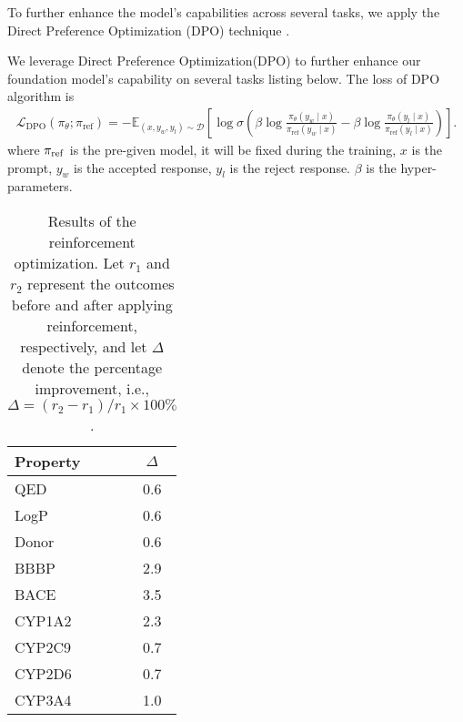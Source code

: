 To further enhance the model's capabilities across several tasks, we apply the Direct Preference Optimization (DPO) technique \cite{rafailov2024direct}. 

We leverage Direct Preference Optimization(DPO)\cite{rafailov2024direct} to further enhance our foundation model's capability on several tasks listing below. 
The loss of DPO algorithm is 
\begin{align}
    \mathcal{L}_{\text{DPO}}(\pi_\theta; \pi_{\text{ref}}) = -\mathbb{E}_{(x, y_w, y_l) \sim \mathcal{D}} \left[ \log \sigma \left( \beta \log \frac{\pi_\theta(y_w \mid x)}{\pi_{\text{ref}}(y_w \mid x)} - \beta \log \frac{\pi_\theta(y_l \mid x)}{\pi_{\text{ref}}(y_l \mid x)} \right) \right].  
\end{align}
where $\pi_{\rm ref}$ is the pre-given model, it will be fixed during the training, $x$ is the prompt, $y_w$ is the accepted response, $y_l$ is the reject response. $\beta$ is the hyper-parameters. 
 

\begin{table}[h]
\centering
\begin{tabular}{lc}
\toprule
Property & $\Delta$  \\
\midrule
QED  & 0.6 \\
LogP  & 0.6 \\
Donor  & 0.6 \\
BBBP  & 2.9 \\
BACE  & 3.5 \\
CYP1A2  & 2.3 \\
CYP2C9  & 0.7 \\
CYP2D6  & 0.7 \\
CYP3A4  & 1.0 \\
\bottomrule
\end{tabular}
\caption{Results of the reinforcement optimization. Let $r_1$ and $r_2$ represent the outcomes before and after applying reinforcement, respectively, and let $\Delta$ denote the percentage improvement, i.e., $\Delta = (r_2 - r_1)/r_1 \times 100\%$. }
\label{tab:dpo-result}
\end{table}


